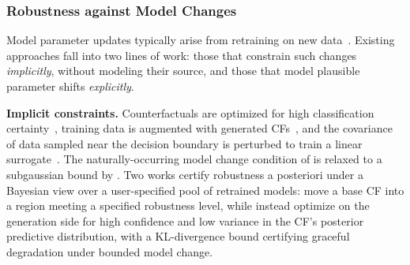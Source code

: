\subsubsection{Robustness against Model Changes}
Model parameter updates typically arise from retraining on new data~\cite{rawal2020algorithmic}. Existing approaches fall into two lines of work: those that constrain such changes \emph{implicitly}, without modeling their source, and those that model plausible parameter shifts \emph{explicitly}.

\textbf{Implicit constraints.}
Counterfactuals are optimized for high classification certainty~\cite{dutta2022robust,Hamman2023Robust,DBLP:conf/aaai/JiangL0T23}, training data is augmented with generated CFs~\cite{ferrario2022robustness}, and the covariance of data sampled near the decision boundary is perturbed to train a linear surrogate~\cite{DBLP:journals/ior/BuiNYN25}. The naturally-occurring model change condition of \citet{Hamman2023Robust} is relaxed to a subgaussian bound by \citet{xu2024generally}. Two works certify robustness a posteriori under a Bayesian view over a user-specified pool of retrained models: \citet{stkepka2025counterfactual} move a base CF into a region meeting a specified robustness level, while \citet{duell2026provably} instead optimize on the generation side for high confidence and low variance in the CF's posterior predictive distribution, with a KL-divergence bound certifying graceful degradation under bounded model change.



